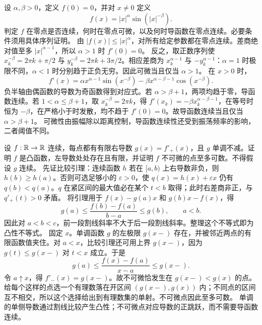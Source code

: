 设 $\alpha,\beta>0$，定义 $f(0)=0$，并对 $x\ne0$ 定义
\[
 f(x)=|x|^\alpha\sin(|x|^{-\beta}).
\]
判定 $f$ 在零点是否连续，何时在零点可微，以及何时导函数在零点连续。必要条件须用具体序列证明。
\solution 由 $|f(x)|\le|x|^\alpha$，对所有给定参数都在零点连续。差商绝对值至多 $|x|^{\alpha-1}$，所以 $\alpha>1$ 时 $f'(0)=0$。
反之，取正数序列使 $x_k^{-\beta}=2\pi k+\pi/2$ 与 $y_k^{-\beta}=2\pi k+3\pi/2$。相应差商为 $x_k^{\alpha-1}$ 与 $-y_k^{\alpha-1}$：$\alpha=1$ 时极限不同，$\alpha<1$ 时分别趋于正负无穷。因此可微当且仅当 $\alpha>1$。
在 $x>0$ 时，
\[
 f'(x)=\alpha x^{\alpha-1}\sin(x^{-\beta})
 -\beta x^{\alpha-\beta-1}\cos(x^{-\beta}).
\]
负半轴由偶函数的导数为奇函数得到对应式。若 $\alpha>\beta+1$，两项均趋于零，导函数连续。若 $1<\alpha\le\beta+1$，取 $x_k^{-\beta}=2\pi k$，得 $f'(x_k)=-\beta x_k^{\alpha-\beta-1}$，在等号时恒为 $-\beta$，在严格小于时发散，均不趋于 $f'(0)=0$。故导函数连续当且仅当 $\alpha>\beta+1$。
\insight 可微性由振幅除以距离控制，导函数连续性还受到振荡频率的影响，二者阈值不同。

设 $f:\mathbb{R}\to\mathbb{R}$ 连续，每点都有有限右导数 $g(x)=f'_+(x)$，且 $g$ 单调不减。证明 $f$ 是凸函数，左导数处处存在且有限，并证明 $f$ 不可微的点至多可数。不得假设 $g$ 连续。
\solution 先证比较引理：连续函数 $h$ 若在 $[a,b)$ 上右导数非负，则 $h(b)\ge h(a)$。否则可选足够小的 $\varepsilon>0$，使 $q(x)=h(x)+\varepsilon x$ 仍有 $q(b)<q(a)$。$q$ 在紧区间的最大值必在某个 $t<b$ 取得；此时右差商非正，与 $q'_+(t)>0$ 矛盾。
将引理用于 $f(x)-g(a)x$ 和 $g(b)x-f(x)$，得
\[
 g(a)\le\frac{f(b)-f(a)}{b-a}\le g(b),\qquad a<b.
\]
因此对 $a<b<c$，前一段割线斜率不大于后一段割线斜率。整理这个不等式即为凸性不等式。
固定 $x$。单调函数 $g$ 的左极限 $g(x-)$ 存在，并被邻近两点的有限函数值夹住。对 $a<x$，比较引理还可用上界 $g(x-)$，因为 $g(t)\le g(x-)$ 对 $t<x$ 成立。于是
\[
 g(a)\le\frac{f(x)-f(a)}{x-a}\le g(x-).
\]
令 $a\uparrow x$，得 $f'_-(x)=g(x-)$。故不可微恰发生在 $g(x-)<g(x)$ 的点。给每个这样的点选一个有理数落在开区间 $(g(x-),g(x))$ 内；不同点的区间互不相交，所以这个选择给出到有理数集的单射。不可微点因此至多可数。
\insight 单调的单侧导数通过割线比较产生凸性；不可微点对应导数的正跳跃，而不需要导函数连续。

